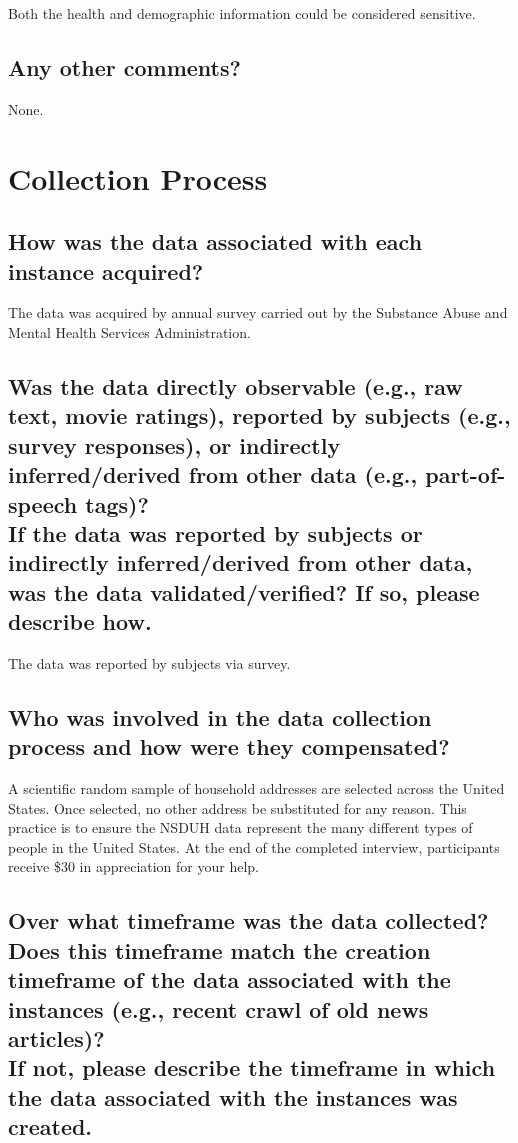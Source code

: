 \documentclass[letterpaper, 10 pt, conference]{ieeeconf}  %
\newcommand{\subtitle}[1]{{\\ \small \normalfont \color{purple} #1}}
\begin{document}
Both the health and demographic information could be considered sensitive.

\subsection{Any other comments?}

None.

\section{Collection Process}

\subsection{How was the data associated with each instance acquired?}

The data was acquired by annual survey carried out by the Substance Abuse and Mental Health Services Administration.

\subsection{Was the data directly observable (e.g., raw text, movie ratings), reported by subjects (e.g., survey responses), or indirectly inferred/derived from other data (e.g., part-of-speech tags)? \subtitle{If the data was reported by subjects or indirectly inferred/derived from other data, was the data validated/verified? If so, please describe how.}}

The data was reported by subjects via survey.

\subsection{Who was involved in the data collection process and how were they compensated?}

A scientific random sample of household addresses are selected across the United States. Once selected, no other address be substituted for any reason. This practice is to ensure the NSDUH data represent the many different types of people in the United States. At the end of the completed interview, participants receive \$30 in appreciation for your help.

\subsection{Over what timeframe was the data collected? Does this timeframe match the creation timeframe of the data associated with the instances (e.g., recent crawl of old news articles)? \subtitle{If not, please describe the timeframe in which the data associated with the instances was created.}}
\end{document}
